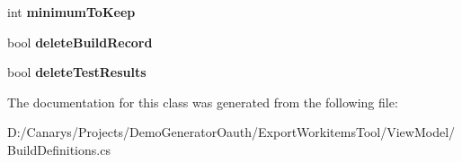 \begin{DoxyCompactItemize}
\item 
\mbox{\label{class_templates_generator_tool_1_1_view_model_1_1_build_definitions_1_1_retention_rule_a986080bdcb6e31bb08965a4ac6ea5ca3}} 
int {\bfseries minimum\+To\+Keep}
\item 
\mbox{\label{class_templates_generator_tool_1_1_view_model_1_1_build_definitions_1_1_retention_rule_a069e8244f9b41f0881ba5674b5fc163d}} 
bool {\bfseries delete\+Build\+Record}
\item 
\mbox{\label{class_templates_generator_tool_1_1_view_model_1_1_build_definitions_1_1_retention_rule_a4f759fb38aeadbe98596d615a284d29d}} 
bool {\bfseries delete\+Test\+Results}
\end{DoxyCompactItemize}


The documentation for this class was generated from the following file\+:\begin{DoxyCompactItemize}
\item 
D\+:/\+Canarys/\+Projects/\+Demo\+Generator\+Oauth/\+Export\+Workitems\+Tool/\+View\+Model/Build\+Definitions.\+cs\end{DoxyCompactItemize}
